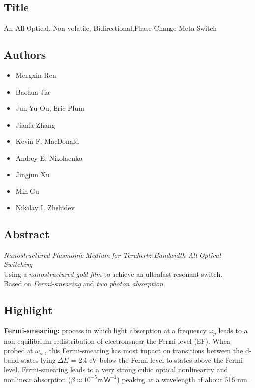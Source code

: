 \documentclass[]{article}
\date{}
\providecommand{\tightlist}{%
  \setlength{\itemsep}{0pt}\setlength{\parskip}{0pt}}
\begin{document}
\subsection{Title}\label{title}

An All-Optical, Non-volatile, Bidirectional,Phase-Change Meta-Switch

\subsection{Authors}\label{authors}

\begin{itemize}
\tightlist
\item
  Mengxin Ren
\item
  Baohua Jia
\item
  Jun-Yu Ou, Eric Plum
\item
  Jianfa Zhang
\item
  Kevin F. MacDonald
\item
  Andrey E. Nikolaenko
\item
  Jingjun Xu
\item
  Min Gu
\item
  Nikolay I. Zheludev
\end{itemize}

\subsection{Abstract}\label{abstract}

\emph{Nanostructured Plasmonic Medium for Terahertz Bandwidth
All-Optical Switching}\\
Using a \emph{nanostructured gold film} to achieve an ultrafast resonant
switch.\\
Based on \emph{Fermi-smearing} and \emph{two photon absorption}.

\subsection{Highlight}\label{highlight}

\textbf{Fermi-smearing:} process in which light absorption at a
frequency $\omega_p$ leads to a non-equilibrium redistribution of electronsnear
the Fermi level (EF). When probed at \(\omega_s\) , this Fermi-smearing
has most impact on transitions between the d-band states lying
\( \Delta E\) = 2.4 eV below the Fermi level to states above the
Fermi level. Fermi-smearing leads to a very strong cubic optical
nonlinearity and nonlinear absorption
(\( \beta \approx 10^{-5} \mathsf{m\,W^{-1}}\)) peaking at a
wavelength of about 516 nm.
\end{document}
